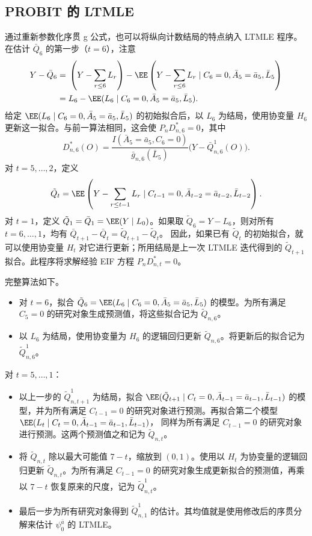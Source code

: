 \subsection{PROBIT 的 LTMLE}

通过重新参数化序贯 g 公式，也可以将纵向计数结局的特点纳入 LTMLE 程序。在估计 $\bar Q_6$ 的第一步（$t=6$），注意
\[
\begin{aligned}
 Y-\bar Q_6={}&\left(Y-\sum_{r\leq6}L_r\right)
 -\EE\left(Y-\sum_{r\leq6}L_r\mid C_6=0,\bar A_5=\bar a_5,\bar L_5\right)\\
 ={}&L_6-\EE(L_6\mid C_6=0,\bar A_5=\bar a_5,\bar L_5).
\end{aligned}
\]
给定 $\EE(L_6\mid C_6=0,\bar A_5=\bar a_5,\bar L_5)$ 的初始拟合后，以 $L_6$ 为结局，使用协变量 $H_6$ 更新这一拟合。与前一算法相同，这会使 $P_nD_{n,6}^*=0$，其中
\[
 D_{n,6}^*(O)=\frac{I(\bar A_5=\bar a_5,C_6=0)}{\bar g_{n,6}(\bar L_5)}
 \bigl(Y-\bar Q_{n,6}^{1}(O)\bigr).
\]
对 $t=5,\ldots,2$，定义
\[
 \tilde Q_t=\EE\left(Y-\sum_{r\leq t-1}L_r\mid
 C_{t-1}=0,\bar A_{t-2}=\bar a_{t-2},\bar L_{t-2}\right).
\]
对 $t=1$，定义 $\tilde Q_1=\bar Q_1=\EE(Y\mid L_0)$。如果取 $\tilde Q_6=Y-L_6$，则对所有 $t=6,\ldots,1$，均有
$\bar Q_{t+1}-\bar Q_t=\tilde Q_{t+1}-\tilde Q_t$。
因此，如果已有 $\tilde Q_t$ 的初始拟合，就可以使用协变量 $H_t$ 对它进行更新；所用结局是上一次 LTMLE 迭代得到的 $\tilde Q_{t+1}$ 拟合。此程序将求解经验 EIF 方程 $P_nD_{n,t}^*=0$。

完整算法如下。
\begin{itemize}
\item 对 $t=6$，拟合 $\tilde Q_6=\EE(L_6\mid C_6=0,\bar A_5=\bar a_5,\bar L_5)$ 的模型。为所有满足 $C_5=0$ 的研究对象生成预测值，将这些拟合记为 $\tilde Q_{n,6}$。
\item 以 $L_6$ 为结局，使用协变量为 $H_6$ 的逻辑回归更新 $\tilde Q_{n,6}$。将更新后的拟合记为 $\tilde Q_{n,6}^{1}$。
\end{itemize}
对 $t=5,\ldots,1$：
\begin{itemize}[label=--]
\item 以上一步的 $\tilde Q_{n,t+1}^{1}$ 为结局，拟合
$\EE(\tilde Q_{t+1}\mid C_t=0,\bar A_{t-1}=\bar a_{t-1},\bar L_{t-1})$
的模型，并为所有满足 $C_{t-1}=0$ 的研究对象进行预测。再拟合第二个模型
$\EE(L_t\mid C_t=0,\bar A_{t-1}=\bar a_{t-1},\bar L_{t-1})$，
同样为所有满足 $C_{t-1}=0$ 的研究对象进行预测。这两个预测值之和记为 $\tilde Q_{n,t}$。
\item 将 $\tilde Q_{n,t}$ 除以最大可能值 $7-t$，缩放到 $(0,1)$。使用以 $H_t$ 为协变量的逻辑回归更新 $\tilde Q_{n,t}$。为所有满足 $C_{t-1}=0$ 的研究对象生成更新拟合的预测值，再乘以 $7-t$ 恢复原来的尺度，记为 $\tilde Q_{n,t}^{1}$。
\end{itemize}
\begin{itemize}
\item 最后一步为所有研究对象得到 $\tilde Q_{n,1}^{1}$ 的估计。其均值就是使用修改后的序贯分解来估计 $\psi_0^{\bar a}$ 的 LTMLE。
\end{itemize}
